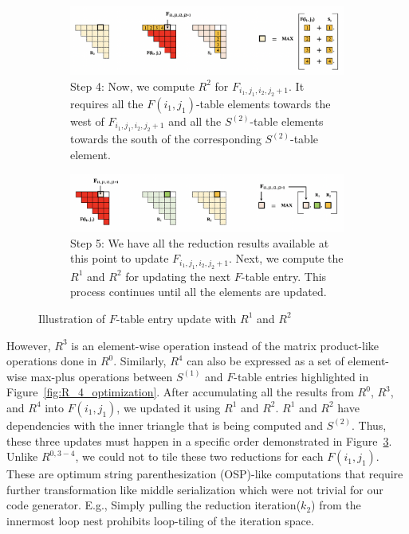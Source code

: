 \begin{figure}[htbp]
\begin{subfigure}[htbp]{1\linewidth}
\centering
\includegraphics[scale=0.35, trim=4 4 4 4,clip]{content/figures/r0_r1_4.png}
\caption{Step 4: Now, we compute $R^{2}$ for  $F_{i_1, j_1, i_2, j_2+1}$. It requires all the $F(i_1, j_1)$-table elements towards the west of $F_{i_1, j_1, i_2, j_2+1}$ and all the $S^{(2)}$-table elements towards the south of the corresponding $S^{(2)}$-table element.}
\label{fig:r3_r4_4}
\end{subfigure}

\begin{subfigure}[htbp]{1\linewidth}
\centering
\includegraphics[scale=0.35, trim=4 4 4 4,clip]{content/figures/r0_r1_5.png}
\caption{Step 5: We have all the reduction results available at this point to update $F_{i_1, j_1, i_2, j_2+1}$. Next, we compute the $R^{1}$ and $R^{2}$ for updating the next $F$-table entry. This process continues until all the elements are updated.}
\label{fig:r3_r4_5}
\end{subfigure}
\caption{Illustration of $F$-table entry update with $R^{1}$ and $R^{2}$}
\label{fig:final_ftable_update}
\end{figure}
However, $R^3$ is an element-wise operation instead of the matrix product-like operations done in $R^{0}$. Similarly, $R^{4}$ can also be expressed as a set of element-wise max-plus operations between $S^{(1)}$ and $F$-table entries highlighted in Figure~\ref{fig:R_4_optimization}. After accumulating all the results from $R^{0}$, $R^{3}$, and $R^{4}$ into $F(i_{1}, j_{1})$, we updated it using $R^{1}$ and $R^{2}$. $R^{1}$ and $R^{2}$ have dependencies with the inner triangle that is being computed and $S^{(2)}$. Thus, these three updates must happen in a specific order demonstrated in Figure~\ref{fig:final_ftable_update}. Unlike $R^{0,3-4}$, we could not to tile these two reductions for each $F(i_{1}, j_{1})$. These are optimum string parenthesization (OSP)-like computations that require further transformation like middle serialization which were not trivial for our code generator. E.g., Simply pulling the reduction iteration($k_{2}$) from the innermost loop nest prohibits loop-tiling of the iteration space.

